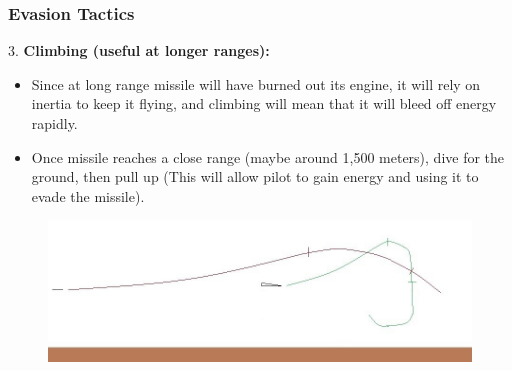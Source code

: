 \documentclass{beamer}
\begin{document}
\begin{frame}
\frametitle{Evasion Tactics}
	3.  \textbf{Climbing (useful at longer ranges):}
	\begin{itemize}
		\item Since at long range missile will have burned out its engine, it will rely on inertia to keep it flying, and climbing will mean that it will bleed off energy rapidly.
		\item Once missile reaches a close range (maybe around 1,500 meters), dive for the ground, then pull up (This will allow pilot to gain energy and using it to evade the missile).
	\end{itemize}

	\begin{figure}[H]
		\centering
		\includegraphics[scale = 0.45]{fig/evasiontech3.jpg}
	\end{figure}
\end{frame}
\end{document}

